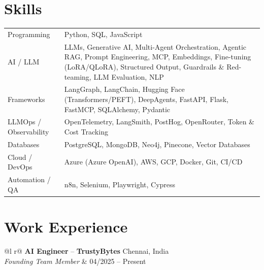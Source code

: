 \documentclass[a4paper,1pt]{article}
\begin{document}
\section{Skills}
\begin{tabularx}{\linewidth}{@{}l X@{}}
Programming &  \normalsize{Python, SQL, JavaScript}\\
AI / LLM &  \normalsize{LLMs, Generative AI, Multi-Agent Orchestration, Agentic RAG, Prompt Engineering, MCP, Embeddings, Fine-tuning (LoRA/QLoRA), Structured Output, Guardrails \& Red-teaming, LLM Evaluation, NLP}\\
Frameworks &  \normalsize{LangGraph, LangChain, Hugging Face (Transformers/PEFT), DeepAgents, FastAPI, Flask, FastMCP, SQLAlchemy, Pydantic}\\
LLMOps / Observability &  \normalsize{OpenTelemetry, LangSmith, PostHog, OpenRouter, Token \& Cost Tracking}\\
Databases &  \normalsize{PostgreSQL, MongoDB, Neo4j, Pinecone, Vector Databases}\\
Cloud / DevOps &  \normalsize{Azure (Azure OpenAI), AWS, GCP, Docker, Git, CI/CD}\\
Automation / QA &  \normalsize{n8n, Selenium, Playwright, Cypress}\\
\end{tabularx}

\section{Work Experience}
\begin{tabularx}{\linewidth}{ @{}l r@{} }
\textbf{AI Engineer} -- \textbf{TrustyBytes} \hfill Chennai, India \\
\textit{Founding Team Member} & \hfill 04/2025 -- Present \\[3.75pt]
  \\
  \\
  \\
  \\
\end{tabularx}
\end{document}
